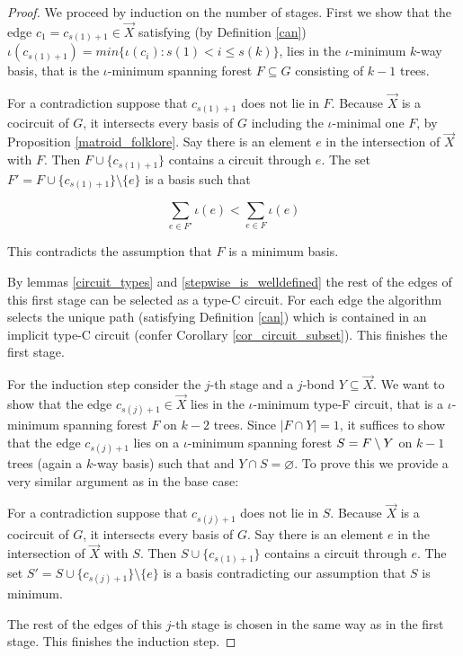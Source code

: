 \begin{proof}
	We proceed by induction on the number of stages. First we show that the edge $c_1 = c_{s(1)+1} \in \vec{X}$ satisfying (by Definition \ref{can}) $\iota(c_{s(1)+1}) = min\{ \iota(c_i) : s(1) < i \leq s(k) \}$, lies in the $\iota$-minimum $k$-way basis, that is the $\iota$-minimum spanning forest $F \subseteq G$ consisting of $k-1$ trees.

	For a contradiction suppose that $c_{s(1)+1}$ does not lie in $F$. Because $\vec X$ is a cocircuit of $G$, it intersects every basis of $G$ including the $\iota$-minimal one $F$, by Proposition \ref{matroid_folklore}. Say there is an element $e$ in the intersection of $\vec X$ with $F$. Then $F \cup \{c_{s(1)+1}\}$ contains a circuit through $e$. The set $F' = F \cup \{c_{s(1)+1}\} \setminus \{e\}$ is a basis such that

\[
	\sum_{e \in F'} \iota(e) < \sum_{e \in F} \iota(e)
\]

This contradicts the assumption that $F$ is a minimum basis.

	By lemmas \ref{circuit_types} and \ref{stepwise_is_welldefined} the rest of the edges of this first stage can be selected as a type-C circuit. For each edge the algorithm selects the unique path (satisfying Definition \ref{can}) which is contained in an implicit type-C circuit (confer Corollary \ref{cor_circuit_subset}). This finishes the first stage.

	For the induction step consider the $j$-th stage and a $j$-bond $Y \subseteq \vec X$. We want to show that the edge $c_{s(j)+1} \in \vec X$ lies in the $\iota$-minimum type-F circuit, that is a $\iota$-minimum spanning forest $F$ on $k-2$ trees. Since $\lvert F \cap Y \rvert = 1$, it suffices to show that the edge $c_{s(j)+1}$ lies on a $\iota$-minimum spanning forest $S = F \setminus Y$ on $k-1$ trees (again a $k$-way basis) such that and $Y \cap S = \varnothing$. To prove this we provide a very similar argument as in the base case:

	For a contradiction suppose that $c_{s(j)+1}$ does not lie in $S$. Because $\vec X$ is a cocircuit of $G$, it intersects every basis of $G$. Say there is an element $e$ in the intersection of $\vec X$ with $S$. Then $S \cup \{c_{s(1)+1}\}$ contains a circuit through $e$. The set $S' = S \cup \{c_{s(j)+1}\} \setminus \{e\}$ is a basis contradicting our assumption that $S$ is minimum.


	The rest of the edges of this $j$-th stage is chosen in the same way as in the first stage. This finishes the induction step.
\end{proof}

